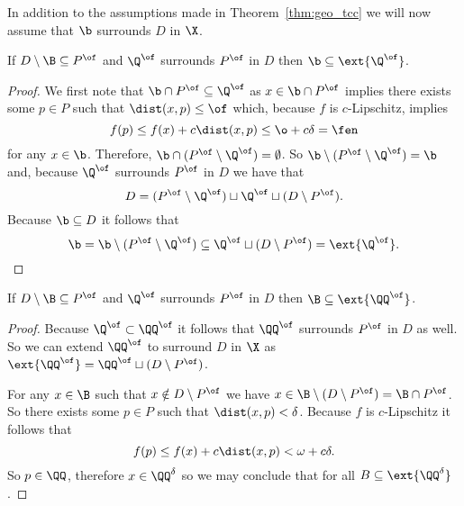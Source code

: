 
In addition to the assumptions made in Theorem~\ref{thm:geo_tcc} we will now assume that $\b$ surrounds $D$ in $\X$.


\begin{lemma}\label{lem:q_contain_1}
  If $D\setminus \B\subseteq P^\of$ and $\Q^\of$ surrounds $P^\of$ in $D$ then $\b\subseteq \ext{\Q^\of}$.
\end{lemma}
\begin{proof}
  We first note that $\b\cap P^\of\subseteq \Q^\of$ as $x\in \b\cap P^\of$ implies there exists some $p\in P$ such that $\dist(x, p)\leq \of$ which, because $f$ is $c$-Lipschitz, implies
  \[ f(p) \leq f(x) + c\dist(x, p)\leq \o + c\delta = \fen\]
  for any $x\in \b$.
  Therefore, $\b\cap (P^\of\setminus \Q^\of) = \emptyset$.
  So $\b\setminus (P^\of\setminus \Q^\of) = \b$ and, because $\Q^\of$ surrounds $P^\of$ in $D$ we have that
  \[ D = (P^\of\setminus \Q^\of)\sqcup \Q^\of \sqcup (D\setminus P^\of).\]
  Because $\b\subseteq D$ it follows that
  \[ \b = \b \setminus (P^\of\setminus \Q^\of)\subseteq \Q^\of\sqcup (D\setminus P^\of) = \ext{\Q^\of}. \]
\end{proof}

\begin{lemma}\label{lem:q_contain_2}
  If $D\setminus \B\subseteq P^\of$ and $\Q^\of$ surrounds $P^\of$ in $D$ then $\B\subseteq \ext{\QQ^\of}$.
\end{lemma}
\begin{proof}
  Because $\Q^\of \subset \QQ^\of$ it follows that $\QQ^\of$ surrounds $P^\of$ in $D$ as well.
  So we can extend $\QQ^\of$ to surround $D$ in $\X$ as $\ext{\QQ^\of} = \QQ^\of\sqcup (D\setminus P^\of)$.

  For any $x\in \B$ such that $x\notin D\setminus P^\of$ we have $x\in \B\setminus (D\setminus P^\of) = \B\cap P^\of$.
  So there exists some $p\in P$ such that $\dist(x, p) < \delta$.
  Because $f$ is $c$-Lipschitz it follows that
  \[ f(p)\leq f(x) + c\dist(x, p) < \omega + c\delta. \]
  So $p\in \QQ$, therefore $x\in \QQ^\delta$ so we may conclude that for all $B\subseteq \ext{\QQ^\delta}$.
\end{proof}

